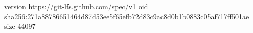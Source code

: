 version https://git-lfs.github.com/spec/v1
oid sha256:271a88786651464d87d53ee5f65efb72d83c9ac8d0b1b0883c05af717ff501ae
size 44097
